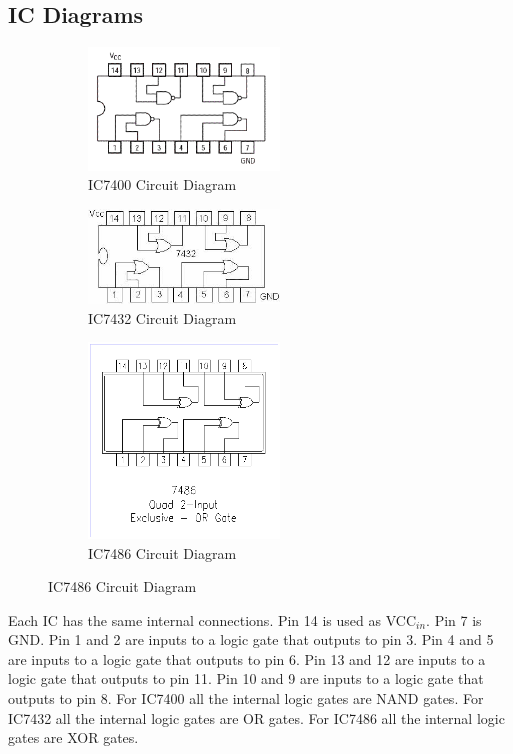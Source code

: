 \documentclass[11pt,a4paper]{article}
\begin{document}
\subsection{IC Diagrams}
\begin{figure}[h]
    \begin{subfigure}{.3\textwidth}
        \includegraphics[width=2in]{IC7400.png}
        \caption{IC7400 Circuit Diagram}
    \end{subfigure}
    \begin{subfigure}{.3\textwidth}
        \includegraphics[width=2in]{IC7432.png}
        \caption{IC7432 Circuit Diagram}
    \end{subfigure}
    \begin{subfigure}{.3\textwidth}
        \includegraphics[width=2in]{IC7486.png}
        \caption{IC7486 Circuit Diagram}
    \end{subfigure}
\end{figure}
Each IC has the same internal connections.
Pin 14 is used as VCC$_{in}$. Pin 7 is GND.
Pin 1 and 2 are inputs to a logic gate that outputs to pin 3.
Pin 4 and 5 are inputs to a logic gate that outputs to pin 6.
Pin 13 and 12 are inputs to a logic gate that outputs to pin 11.
Pin 10 and 9 are inputs to a logic gate that outputs to pin 8.
For IC7400 all the internal logic gates are NAND gates.
For IC7432 all the internal logic gates are OR gates.
For IC7486 all the internal logic gates are XOR gates.
\end{document}
